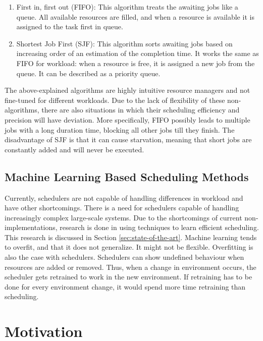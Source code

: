 \begin{enumerate}
\item First in, first out (FIFO): This algorithm treats the awaiting jobs like
    a queue. All available resources are filled, and when a resource is
        available it is assigned to the task first in queue.
\item Shortest Job First (SJF): This algorithm sorts awaiting jobs based on
    increasing order of an estimation of the completion time. It works the
        same as FIFO for workload: when a resource is free, it is assigned a
        new job from the queue. It can be described as a priority queue.
\end{enumerate}

The above-explained algorithms are highly intuitive resource managers and not
fine-tuned for different workloads. Due to the lack of flexibility of these
non-\ai algorithms, there are also situations in which their scheduling
efficiency and precision will have deviation. More specifically, FIFO possibly
leads to multiple jobs with a long duration time, blocking all other jobs till
they finish. The disadvantage of SJF is that it can cause starvation, meaning
that short jobs are constantly added and will never be executed.


\subsection{Machine Learning Based Scheduling Methods}

Currently, schedulers are not capable of handling differences in workload and
have other shortcomings. There is a need for schedulers capable of handling
increasingly complex large-scale systems. Due to the shortcomings of current
non-\ai implementations, research is done in using \ml techniques to learn
efficient scheduling. This research is discussed in Section
\ref{sec:state-of-the-art}. Machine learning tends to overfit, and that it
does not generalize. It might not be flexible. Overfitting is also the case
with \rlbased schedulers. Schedulers can show undefined behaviour when
resources are added or removed. Thus, when a change in environment occurs,
the \rlbased scheduler gets retrained to work in the new environment. If
retraining has to be done for every environment change, it would spend more
time retraining than scheduling.


\section{Motivation}

